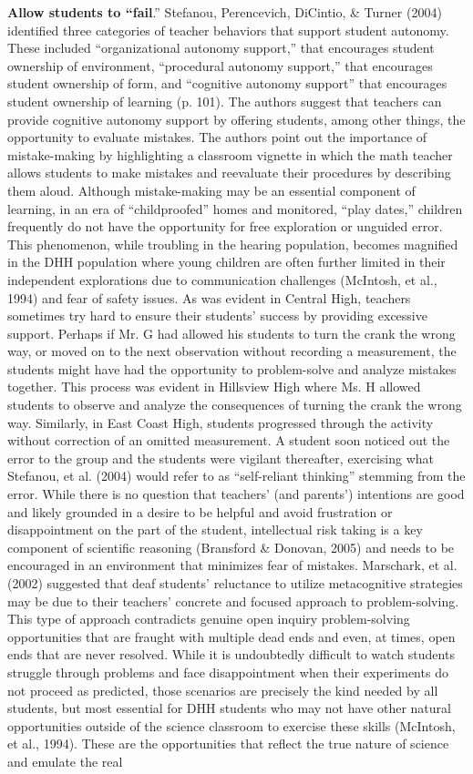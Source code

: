 \documentclass[11.5pt]{sig-alternate} %
\begin{document}
\begin{large}
\textbf{Allow students to “fail}.”  Stefanou, Perencevich, DiCintio, \& Turner (2004) identified three categories of teacher behaviors that support student autonomy. These included “organizational autonomy support,” that encourages student ownership of environment, “procedural autonomy support,” that encourages student ownership of form, and   “cognitive autonomy support” that encourages student ownership of learning (p. 101).  The authors suggest that teachers can provide  cognitive autonomy support by offering students, among other things, the opportunity to evaluate mistakes.  The authors point out the importance of mistake-making by highlighting a classroom vignette in which the math teacher allows students to make mistakes and reevaluate their procedures by describing them aloud.   Although mistake-making may be an essential component of learning, in an era of “childproofed” homes and monitored, “play dates,” children frequently do not have the opportunity for free exploration or unguided error.  This phenomenon, while troubling in the hearing population, becomes magnified in the DHH population where young children are often further limited in their independent explorations due to communication challenges (McIntosh, et al., 1994) and fear of safety issues.  As was evident in Central High, teachers sometimes try hard to ensure their students’ success by providing excessive support.  Perhaps if Mr. G had allowed his students to turn the crank the wrong way, or moved on to the next observation without recording a measurement, the students might have had the opportunity to problem-solve and analyze mistakes together.  This process was evident in Hillsview High where Ms. H allowed students to observe and analyze the consequences of turning the crank the wrong way.  Similarly, in East Coast High, students progressed through the activity without correction of an omitted measurement.  A student soon noticed out the error to the group and the students were vigilant thereafter, exercising what Stefanou, et al. (2004) would refer to as “self-reliant thinking” stemming from the error.  While there is no question that teachers’ (and parents’) intentions are good and likely grounded in a desire to be helpful and avoid frustration or disappointment on the part of the student, intellectual risk taking is a key component of scientific reasoning (Bransford \& Donovan, 2005) and needs to be encouraged in an environment that minimizes fear of mistakes.  Marschark, et al. (2002) suggested that deaf students’ reluctance to utilize metacognitive strategies  may be due to their teachers’ concrete and focused approach to problem-solving. This type of approach contradicts genuine open inquiry problem-solving opportunities that are fraught with multiple dead ends and even, at times, open ends that are never resolved. While it is undoubtedly difficult to watch students struggle through problems and face disappointment when their experiments do not proceed as predicted, those scenarios are precisely the kind needed by all students, but most essential for DHH students who may not have other natural opportunities outside of the science classroom to exercise these skills (McIntosh, et al., 1994). These are the opportunities that reflect the true nature of science and emulate the real 
\end{large}
\end{document}
